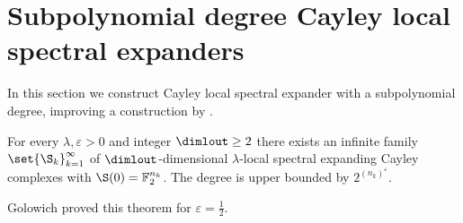\section{Subpolynomial degree Cayley local spectral expanders}
\label{sec:construction-subpoly-HDX}
%
In this section we construct Cayley local spectral expander with a subpolynomial degree, improving a construction by \cite{Golowich2023}.

\begin{theorem} \label{thm:main-recursive-hdx}
    For every \(\lambda, \varepsilon > 0\) and integer \(\dimlout \geq 2\) there exists %
    an infinite family \(\set{\S_k}_{k=1}^\infty\) of \(\dimlout\)-dimensional \(\lambda\)-local spectral expanding Cayley complexes with \(\S(0)=\mathbb{F}_2^{n_k}\). The degree is upper bounded by \(2^{ (n_k)^{\varepsilon}}\).
\end{theorem}
Golowich proved this theorem for \(\varepsilon = \frac{1}{2}\).

